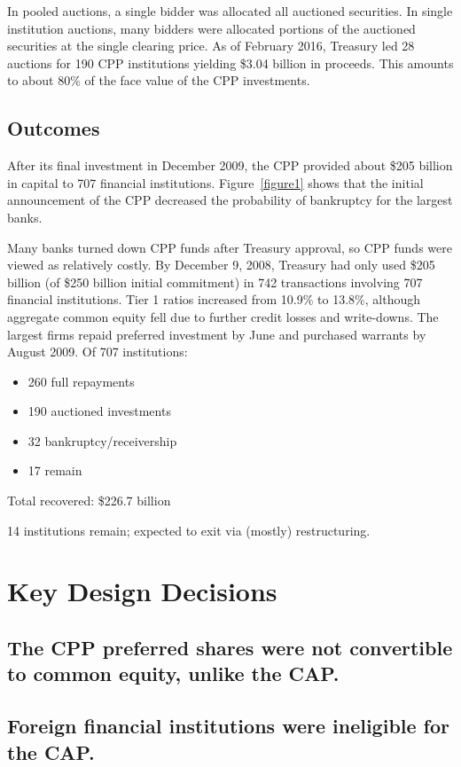 \documentclass[12pt]{article}
\begin{document}
In pooled auctions, a single bidder was allocated all auctioned securities. In single institution auctions, many bidders were allocated portions of the auctioned securities at the single clearing price. As of February 2016, Treasury led 28 auctions for 190 CPP institutions yielding \$3.04 billion in proceeds. This amounts to about 80\% of the face value of the CPP investments. 




\subsection{Outcomes}
After its final investment in December 2009, the CPP provided about \$205 billion in capital to 707 financial institutions. Figure~\ref{figure1} shows that the initial announcement of the CPP decreased the probability of bankruptcy for the largest banks.


Many banks turned down CPP funds after Treasury approval, so CPP funds were viewed as relatively costly. 
By December 9, 2008, Treasury had only used \$205 billion  (of \$250 billion initial commitment) in 742 transactions involving 707 financial institutions.
Tier 1 ratios increased from 10.9\% to 13.8\%, although aggregate common equity fell due to further credit losses and write-downs.
The largest firms repaid preferred investment by June and purchased warrants by August 2009.
Of 707 institutions: 
\begin{itemize}
\item 260 full repayments
\item 190 auctioned investments
\item 32 bankruptcy/receivership
\item 17 remain 
\end{itemize}
Total recovered: \$226.7 billion

14 institutions remain; expected to exit via (mostly) restructuring.


\section{Key Design Decisions}

\subsection{The CPP preferred shares were not convertible to common equity, unlike the CAP.}

\subsection{Foreign financial institutions were ineligible for the CAP.}
\end{document}
